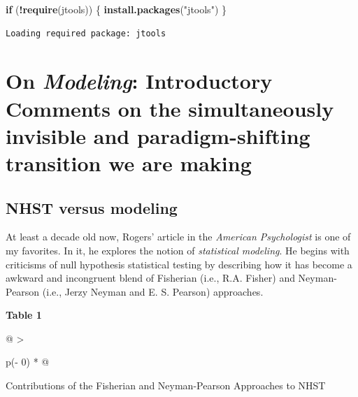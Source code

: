 \documentclass[
  11pt,
]{book}
\newenvironment{Shaded}{\begin{snugshade}}{\end{snugshade}}
\newcommand{\ControlFlowTok}[1]{\textcolor[rgb]{0.27,0.27,0.27}{\textbf{#1}}}
\newcommand{\FunctionTok}[1]{\textcolor[rgb]{0.27,0.27,0.27}{\textbf{#1}}}
\newcommand{\NormalTok}[1]{#1}
\newcommand{\SpecialCharTok}[1]{\textcolor[rgb]{0.43,0.43,0.43}{\textbf{#1}}}
\newcommand{\StringTok}[1]{\textcolor[rgb]{0.5,0.5,0.5}{#1}}
\begin{document}
\begin{Shaded}
\begin{Highlighting}[]
\ControlFlowTok{if}\NormalTok{ (}\SpecialCharTok{!}\FunctionTok{require}\NormalTok{(jtools)) \{}
    \FunctionTok{install.packages}\NormalTok{(}\StringTok{"jtools"}\NormalTok{)}
\NormalTok{\}}
\end{Highlighting}
\end{Shaded}

\begin{verbatim}
Loading required package: jtools
\end{verbatim}

\hypertarget{on-modeling-introductory-comments-on-the-simultaneously-invisible-and-paradigm-shifting-transition-we-are-making}{%
\section{\texorpdfstring{On \emph{Modeling}: Introductory Comments on the simultaneously invisible and paradigm-shifting transition we are making}{On Modeling: Introductory Comments on the simultaneously invisible and paradigm-shifting transition we are making}}\label{on-modeling-introductory-comments-on-the-simultaneously-invisible-and-paradigm-shifting-transition-we-are-making}}

\hypertarget{nhst-versus-modeling}{%
\subsection{NHST versus modeling}\label{nhst-versus-modeling}}

At least a decade old now, Rogers' \citeyearpar{rodgers_epistemology_2010} article in the \emph{American Psychologist} is one of my favorites. In it, he explores the notion of \emph{statistical modeling}. He begins with criticisms of null hypothesis statistical testing by describing how it has become a awkward and incongruent blend of Fisherian (i.e., R.A. Fisher) and Neyman-Pearson (i.e., Jerzy Neyman and E. S. Pearson) approaches.

\textbf{Table 1}

\begin{longtable}[]{@{}
  >{\raggedright\arraybackslash}p{(\columnwidth - 0\tabcolsep) * }@{}}
\toprule\noalign{}
\begin{minipage}[b]{\linewidth}\raggedright
Contributions of the Fisherian and Neyman-Pearson Approaches to NHST \citep{rodgers_epistemology_2010}
\end{minipage} \\
\midrule\noalign{}
\endhead
\bottomrule\noalign{}
\endlastfoot
\end{longtable}
\end{document}
